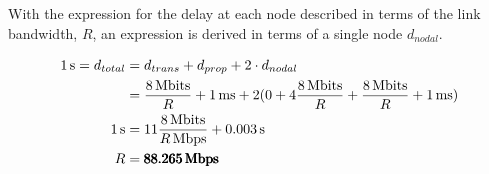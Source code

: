\documentclass[12pt,letterpaper]{article}
\begin{document}
With the expression for the delay at each node described in terms of the link bandwidth,
$R$, an expression is derived in terms of a single node $d_{nodal}$.

\begin{align*}
\SI{1}{s} = d_{total} &= d_{trans} + d_{prop} + 2 \cdot d_{nodal} \\
&= \frac{\SI{8}{Mbits}}{R} + \SI{1}{ms} + 2(0 + 4\frac{\SI{8}{Mbits}}{R} + \frac{\SI{8}{Mbits}}{R} + \SI{1}{ms}) \\
\SI{1}{s} &= 11\frac{\SI{8}{Mbits}}{\SI[parse-numbers = false]{R}{Mbps}} + \SI{0.003}{s} \\
R &= \pmb{\SI{88.265}{Mbps}} 
\end{align*}
\end{document}
